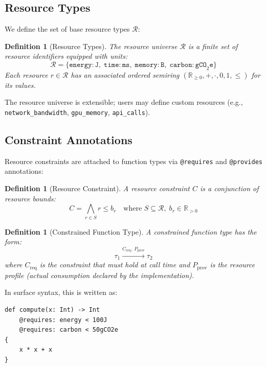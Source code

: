\documentclass[11pt,a4paper]{article}
\newtheorem{definition}[theorem]{Definition}
\begin{document}
\subsection{Resource Types}

We define the set of base resource types $\mathcal{R}$:

\begin{definition}[Resource Types]
\label{def:resource-types}
The resource universe $\mathcal{R}$ is a finite set of resource identifiers
equipped with units:
\[
  \mathcal{R} = \{ \texttt{energy} : \texttt{J},\;
                   \texttt{time} : \texttt{ms},\;
                   \texttt{memory} : \texttt{B},\;
                   \texttt{carbon} : \texttt{gCO}_2\texttt{e} \}
\]
Each resource $r \in \mathcal{R}$ has an associated ordered semiring
$(\mathbb{R}_{\geq 0}, +, \cdot, 0, 1, \leq)$ for its values.
\end{definition}

The resource universe is extensible; users may define custom resources (e.g.,
\texttt{network\_bandwidth}, \texttt{gpu\_memory}, \texttt{api\_calls}).

\subsection{Constraint Annotations}

Resource constraints are attached to function types via \texttt{@requires} and
\texttt{@provides} annotations:

\begin{definition}[Resource Constraint]
A resource constraint $C$ is a conjunction of resource bounds:
\[
  C = \bigwedge_{r \in S} r \leq b_r
  \quad \text{where } S \subseteq \mathcal{R},\; b_r \in \mathbb{R}_{> 0}
\]
\end{definition}

\begin{definition}[Constrained Function Type]
A constrained function type has the form:
\[
  \tau_1 \xrightarrow{C_{\mathrm{req}},\, P_{\mathrm{prov}}} \tau_2
\]
where $C_{\mathrm{req}}$ is the constraint that must hold at call time and
$P_{\mathrm{prov}}$ is the resource profile (actual consumption declared by the
implementation).
\end{definition}

In surface syntax, this is written as:

\begin{lstlisting}
def compute(x: Int) -> Int
    @requires: energy < 100J
    @requires: carbon < 50gCO2e
{
    x * x + x
}
\end{lstlisting}
\end{document}
